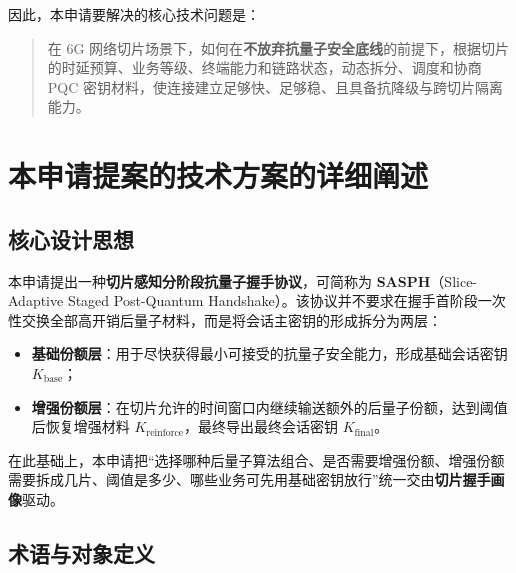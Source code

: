 \documentclass[12pt,a4paper]{article}
\newcommand{\Kfinal}{K_{\mathrm{final}}}
\newcommand{\Kbase}{K_{\mathrm{base}}}
\newcommand{\Krein}{K_{\mathrm{reinforce}}}
\begin{document}
因此，本申请要解决的核心技术问题是：

\begin{quote}
在 6G 网络切片场景下，如何在\textbf{不放弃抗量子安全底线}的前提下，根据切片的时延预算、业务等级、终端能力和链路状态，动态拆分、调度和协商 PQC 密钥材料，使连接建立足够快、足够稳、且具备抗降级与跨切片隔离能力。
\end{quote}

\section{本申请提案的技术方案的详细阐述}

\subsection{核心设计思想}

本申请提出一种\textbf{切片感知分阶段抗量子握手协议}，可简称为 \textbf{SASPH}（Slice-Adaptive Staged Post-Quantum Handshake）。该协议并不要求在握手首阶段一次性交换全部高开销后量子材料，而是将会话主密钥的形成拆分为两层：

\begin{itemize}[leftmargin=2em]
    \item \textbf{基础份额层}：用于尽快获得最小可接受的抗量子安全能力，形成基础会话密钥 $\Kbase$；
    \item \textbf{增强份额层}：在切片允许的时间窗口内继续输送额外的后量子份额，达到阈值后恢复增强材料 $\Krein$，最终导出最终会话密钥 $\Kfinal$。
\end{itemize}

在此基础上，本申请把“选择哪种后量子算法组合、是否需要增强份额、增强份额需要拆成几片、阈值是多少、哪些业务可先用基础密钥放行”统一交由\textbf{切片握手画像}驱动。

\subsection{术语与对象定义}
\end{document}

